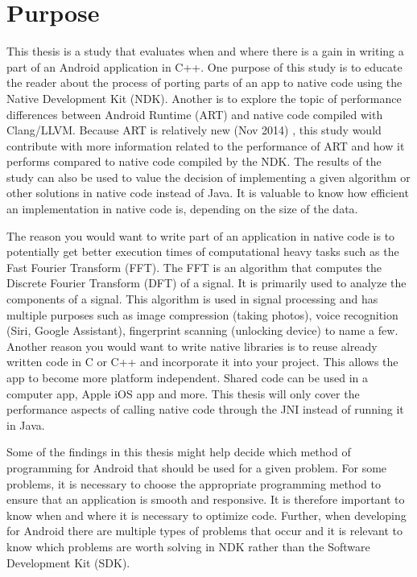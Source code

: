 \section{Purpose}
This thesis is a study that evaluates when and where there is a gain in writing a part of an Android application in C++. One purpose of this study is to educate the reader about the process of porting parts of an app to native code using the Native Development Kit (NDK). Another is to explore the topic of performance differences between Android Runtime (ART) and native code compiled with Clang/LLVM. Because ART is relatively new (Nov 2014) \cite{android:dalvik:release}, this study would contribute with more information related to the performance of ART and how it performs compared to native code compiled by the NDK. The results of the study can also be used to value the decision of implementing a given algorithm or other solutions in native code instead of Java. It is valuable to know how efficient an implementation in native code is, depending on the size of the data.


The reason you would want to write part of an application in native code is to potentially get better execution times of computational heavy tasks such as the Fast Fourier Transform (FFT). The FFT is an algorithm that computes the Discrete Fourier Transform (DFT) of a signal. It is primarily used to analyze the components of a signal. This algorithm is used in signal processing and has multiple purposes such as image compression (taking photos), voice recognition (Siri, Google Assistant), fingerprint scanning (unlocking device) to name a few. Another reason you would want to write native libraries is to reuse already written code in C or C++ and incorporate it into your project. This allows the app to become more platform independent. Shared code can be used in a computer app, Apple iOS app and more. This thesis will only cover the performance aspects of calling native code through the JNI instead of running it in Java.

Some of the findings in this thesis might help decide which method of programming for Android that should be used for a given problem. For some problems, it is necessary to choose the appropriate programming method to ensure that an application is smooth and responsive. It is therefore important to know when and where it is necessary to optimize code. Further, when developing for Android there are multiple types of problems that occur and it is relevant to know which problems are worth solving in NDK rather than the Software Development Kit (SDK).

